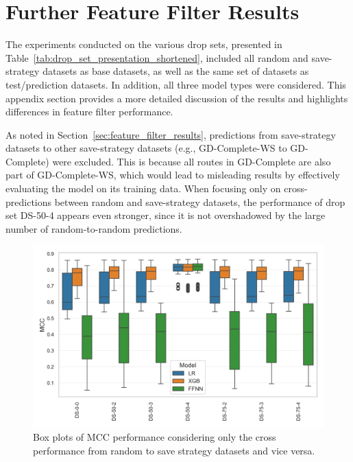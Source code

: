 \clearpage
\section{Further Feature Filter Results}
\label{app:sec:further_feature_filter}
The experiments conducted on the various drop sets, presented in Table~\ref{tab:drop_set_presentation_shortened}, included all
random and save-strategy datasets as base datasets, as well as the same set of datasets as test/prediction datasets.
In addition, all three model types were considered. This appendix section provides a more detailed discussion of the
results and highlights differences in feature filter performance.

As noted in Section~\ref{sec:feature_filter_results}, predictions from save-strategy datasets to other save-strategy datasets
(e.g., GD-Complete-WS to GD-Complete) were excluded. This is because all routes in GD-Complete are also part of GD-Complete-WS,
which would lead to misleading results by effectively evaluating the model on its training data. When focusing only on cross-predictions
between random and save-strategy datasets, the performance of drop set DS-50-4 appears even stronger, since it is not overshadowed by
the large number of random-to-random predictions.
\begin{figure}[ht]
	\centering
	\includegraphics[width = .85\textwidth]{pictures/feature_filter/cross_performance_boxplot.png}
	\caption{Box plots of MCC performance considering only the cross performance from random to save strategy datasets and vice versa.}
	\label{fig:mcc_filter_results_cross}
\end{figure}

